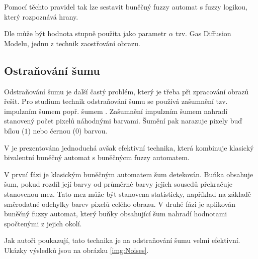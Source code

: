 \documentclass[a4paper,10pt]{article}
\begin{document}
Pomocí těchto pravidel tak lze sestavit buněčný fuzzy automat s fuzzy logikou, který rozpoznává hrany. 

Dle \cite{MarMeySol-HybMetGasDifModFuzCelAutImSha} může být hodnota stupně  použita jako parametr $\alpha$ tzv. Gas Diffusion Modelu, jednu z technik zaostřování obrazu.

\subsection{Ostraňování šumu}
Odstraňování šumu je další častý problém, který je třeba při zpracování obrazů řešit. Pro studium technik odstraňování šumu se používá zašumnění tzv. impulzním šumem popř. šumem . Zašumnění impulzním šumem nahradí stanovený počet pixelů náhodnými barvami. Šumění  pak narazuje pixely buď bílou ($1$) nebo černou ($0$) barvou.

V \cite{SadRetKam-EfMetImpNoiRedImFuzCelAut} je prezentována jednoduchá avšak efektivní technika, která kombinuje klasický bivalentní buněčný automat s buněčnýcm fuzzy automatem. 

V první fázi je klasickým buněčným automatem šum detekován. Buňka obsahuje šum, pokud rozdíl její barvy od průměrné barvy jejich sousedů překračuje stanovenou mez. Tato mez může být stanovena statisticky, například na základě směrodatné odchylky barev pixelů celého obrazu. V druhé fázi je aplikován buněčný fuzzy automat, který buňky obsahující šum nahradí hodnotami spočtenými z jejich okolí. 

Jak autoři poukazují, tato technika je na odstraňování šumu velmi efektivní. Ukázky výsledků jsou na obrázku \ref{img:Noises}. 
\end{document}
